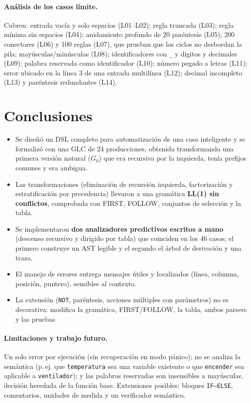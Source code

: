 \paragraph{Análisis de los casos límite.} Cubren: entrada vacía y solo espacios (L01--L02); regla truncada (L03); regla mínima sin espacios (L04);
anidamiento profundo de 20 paréntesis (L05); 200 conectores (L06) y 100 reglas (L07), que prueban que los ciclos no desbordan la pila;
mayúsculas/minúsculas (L08); identificadores con \texttt{\_} y dígitos y decimales (L09); palabra reservada como identificador (L10);
número pegado a letras (L11); error ubicado en la línea 3 de una entrada multilínea (L12); decimal incompleto (L13) y paréntesis redundantes (L14).

\section{Conclusiones}

\begin{itemize}[nosep]
\item Se diseñó un DSL completo para automatización de una casa inteligente y se formalizó con una GLC de 24 producciones,
obtenida transformando una primera versión natural ($G_0$) que era recursiva por la izquierda, tenía prefijos comunes y era ambigua.
\item Las transformaciones (eliminación de recursión izquierda, factorización y estratificación por precedencia) llevaron a una gramática
\textbf{LL(1) sin conflictos}, comprobada con FIRST, FOLLOW, conjuntos de selección y la tabla.
\item Se implementaron \textbf{dos analizadores predictivos escritos a mano} (descenso recursivo y dirigido por tabla) que coinciden en los 46 casos;
el primero construye un AST legible y el segundo el árbol de derivación y una traza.
\item El manejo de errores entrega mensajes útiles y localizados (línea, columna, posición, puntero), sensibles al contexto.
\item La extensión (\texttt{NOT}, paréntesis, acciones múltiples con parámetros) no es decorativa: modifica la gramática, FIRST/FOLLOW, la tabla, ambos
parsers y las pruebas.
\end{itemize}

\paragraph{Limitaciones y trabajo futuro.} Un solo error por ejecución (sin recuperación en modo pánico); no se analiza la semántica
(p.\,ej. que \texttt{temperatura} sea una variable existente o que \texttt{encender} sea aplicable a \texttt{ventilador}); y las palabras reservadas
son insensibles a mayúsculas, decisión heredada de la función base. Extensiones posibles: bloques \texttt{IF--ELSE}, comentarios, unidades de medida y
un verificador semántico.

